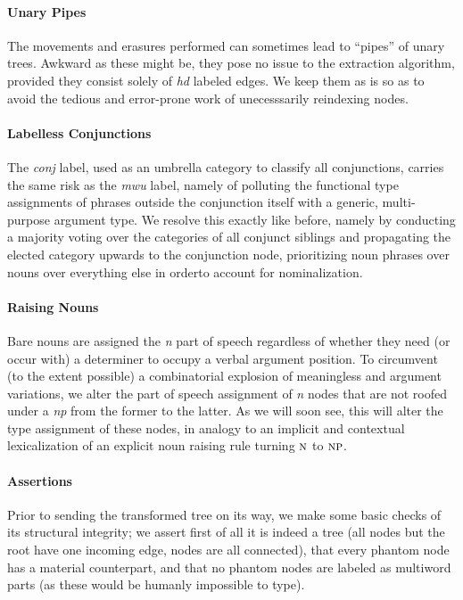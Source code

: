 \paragraph{Unary Pipes}
The movements and erasures performed can sometimes lead to ``pipes'' of unary trees.
Awkward as these might be, they pose no issue to the extraction algorithm, provided they consist solely of \textit{hd} labeled edges.
We keep them as is so as to avoid the tedious and error-prone work of unecesssarily reindexing nodes.

\paragraph{Labelless Conjunctions}
The \textit{conj} label, used as an umbrella category to classify all conjunctions, carries the same risk as the \textit{mwu} label, namely of polluting the functional type assignments of phrases outside the conjunction itself with a generic, multi-purpose argument type.
We resolve this exactly like before, namely by conducting a majority voting over the categories of all conjunct siblings and propagating the elected category upwards to the conjunction node, prioritizing noun phrases over nouns over everything else in orderto account for nominalization.

\paragraph{Raising Nouns}
Bare nouns are assigned the \textit{n} part of speech regardless of whether they need (or occur with) a determiner to occupy a verbal argument position.
To circumvent (to the extent possible) a combinatorial explosion of meaningless  and  argument variations, we alter the part of speech assignment of \textit{n} nodes that are not roofed under a \textit{np} from the former to the latter.
As we will soon see, this will alter the type assignment of these nodes, in analogy to an implicit and contextual lexicalization of an explicit noun raising rule turning $\n[s]$ to $\np[s]$.

\paragraph{Assertions}
Prior to sending the transformed tree on its way, we make some basic checks of its structural integrity; we assert first of all it is indeed a tree (all nodes but the root have one incoming edge, nodes are all connected), that every phantom node has a material counterpart, and that no phantom nodes are labeled as multiword parts (as these would be humanly impossible to type).

